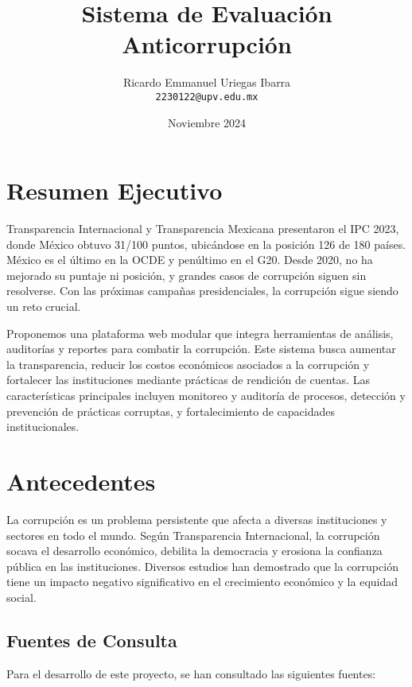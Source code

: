\documentclass[a4paper,12pt]{article}
\title{Sistema de Evaluación Anticorrupción}
\author{Ricardo Emmanuel Uriegas Ibarra \\ 
\texttt{2230122@upv.edu.mx}}
\date{Noviembre 2024}
\begin{document}

\section{Resumen Ejecutivo}
Transparencia Internacional y Transparencia Mexicana presentaron el IPC 2023, donde México obtuvo 31/100 puntos, ubicándose en la posición 126 de 180 países. México es el último en la OCDE y penúltimo en el G20. Desde 2020, no ha mejorado su puntaje ni posición, y grandes casos de corrupción siguen sin resolverse. Con las próximas campañas presidenciales, la corrupción sigue siendo un reto crucial.

Proponemos una plataforma web modular que integra herramientas de análisis, auditorías y reportes para combatir la corrupción. Este sistema busca aumentar la transparencia, reducir los costos económicos asociados a la corrupción y fortalecer las instituciones mediante prácticas de rendición de cuentas. Las características principales incluyen monitoreo y auditoría de procesos, detección y prevención de prácticas corruptas, y fortalecimiento de capacidades institucionales.

\section{Antecedentes}
La corrupción es un problema persistente que afecta a diversas instituciones y sectores en todo el mundo. Según Transparencia Internacional, la corrupción socava el desarrollo económico, debilita la democracia y erosiona la confianza pública en las instituciones. Diversos estudios han demostrado que la corrupción tiene un impacto negativo significativo en el crecimiento económico y la equidad social.

\subsection{Fuentes de Consulta}
Para el desarrollo de este proyecto, se han consultado las siguientes fuentes:
\end{document}
